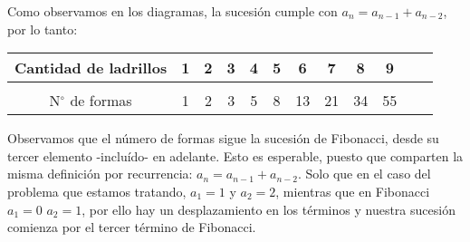 \begin{center}
\end{center}

\begin{center}
\end{center}

\begin{center}
\end{center}

Como observamos en los diagramas,
la sucesión cumple con \(a_n = a_{n-1} + a_{n-2}\),
por lo tanto:

\begin{center}
    \begin{tabular}{ c c c c c c c c c c c c }
        Cantidad de ladrillos   & 1 & 2 & 3 & 4 & 5 & 6  & 7  & 8  & 9  \\
        \hline                  &                                       \\ [-1em]
        N\(^{\circ}\) de formas & 1 & 2 & 3 & 5 & 8 & 13 & 21 & 34 & 55 \\
        \hline
    \end{tabular}
\end{center}

Observamos que el número de formas sigue la sucesión de Fibonacci,
desde su tercer elemento -incluído- en adelante.
Esto es esperable, puesto que comparten la misma definición por recurrencia:
\(a_n = a_{n-1} + a_{n-2}\).
Solo que en el caso del problema que estamos tratando, \(a_{1} = 1\) y 
\(a_{2} = 2\), mientras que en Fibonacci \(a_{1} = 0\) \(a_{2} = 1\),
por ello hay un desplazamiento en los términos y nuestra sucesión comienza por 
el tercer término de Fibonacci.